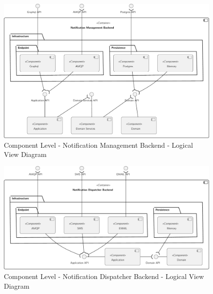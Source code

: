 \begin{figure}[H]
   \centering
   \includegraphics[page=1,width=\columnwidth]{assets/diagrams/design/architectural/level3/logical/notification-management-backend.pdf}
   \caption[Component Level - Notification Management Backend - Logical View Diagram]{Component Level - Notification Management Backend - Logical View Diagram}
   \label{fig:AppendixC2:noti}
\end{figure}

\begin{figure}[H]
   \centering
   \includegraphics[page=1,width=\columnwidth]{assets/diagrams/design/architectural/level3/logical/notification-dispatcher-backend.pdf}
   \caption[Component Level - Notification Dispatcher Backend - Logical View Diagram]{Component Level - Notification Dispatcher Backend - Logical View Diagram}
   \label{fig:AppendixC2:notidispatcher}
\end{figure}
